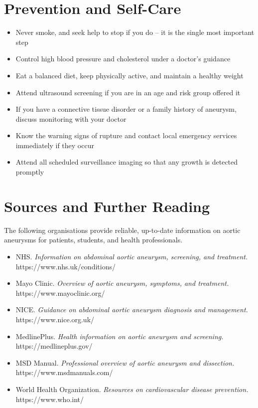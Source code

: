 \section*{Prevention and Self-Care}
\begin{itemize}
    \item Never smoke, and seek help to stop if you do -- it is the single most important step
    \item Control high blood pressure and cholesterol under a doctor's guidance
    \item Eat a balanced diet, keep physically active, and maintain a healthy weight
    \item Attend ultrasound screening if you are in an age and risk group offered it
    \item If you have a connective tissue disorder or a family history of aneurysm, discuss monitoring with your doctor
    \item Know the warning signs of rupture and contact local emergency services immediately if they occur
    \item Attend all scheduled surveillance imaging so that any growth is detected promptly
\end{itemize}

\section*{Sources and Further Reading}
The following organisations provide reliable, up-to-date information on aortic aneurysms for patients, students, and health professionals.

\begin{itemize}
    \item NHS. \textit{Information on abdominal aortic aneurysm, screening, and treatment.} https://www.nhs.uk/conditions/
    \item Mayo Clinic. \textit{Overview of aortic aneurysm, symptoms, and treatment.} https://www.mayoclinic.org/
    \item NICE. \textit{Guidance on abdominal aortic aneurysm diagnosis and management.} https://www.nice.org.uk/
    \item MedlinePlus. \textit{Health information on aortic aneurysm and screening.} https://medlineplus.gov/
    \item MSD Manual. \textit{Professional overview of aortic aneurysm and dissection.} https://www.msdmanuals.com/
    \item World Health Organization. \textit{Resources on cardiovascular disease prevention.} https://www.who.int/
\end{itemize}
